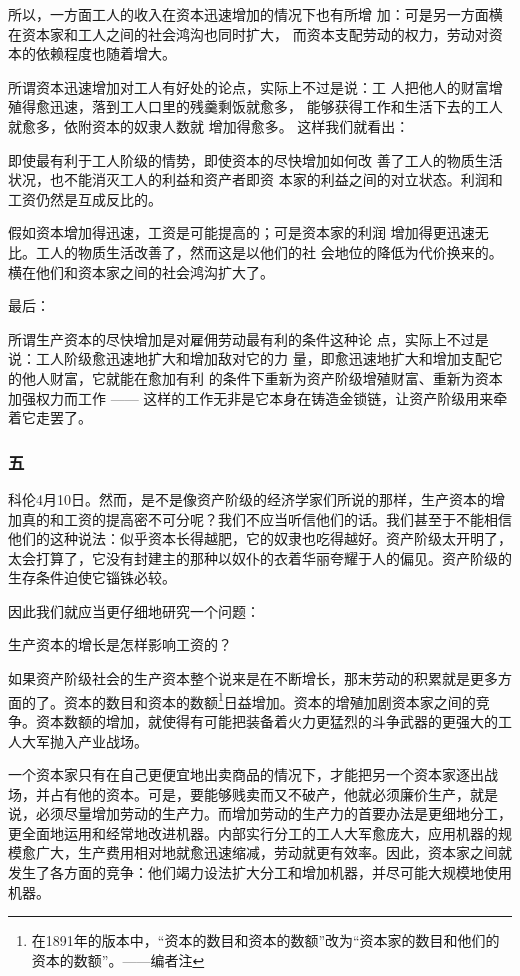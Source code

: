 \documentclass[a4paper,twoside,12pt,AutoFakeBold]{ctexart}
\begin{document}
所以，一方面工人的收入在资本迅速增加的情况下也有所增
加：可是另一方面横在资本家和工人之间的社会鸿沟也同时扩大，
而资本支配劳动的权力，劳动对资本的依赖程度也随着增大。

所谓资本迅速增加对工人有好处的论点，实际上不过是说：工
人把他人的财富增殖得愈迅速，落到工人口里的残羹剩饭就愈多，
能够获得工作和生活下去的工人就愈多，依附资本的奴隶人数就
增加得愈多。
这样我们就看出：

即使最有利于工人阶级的情势，即使资本的尽快增加如何改
善了工人的物质生活状况，也不能消灭工人的利益和资产者即资
本家的利益之间的对立状态。利润和工资仍然是互成反比的。

假如资本增加得迅速，工资是可能提高的；可是资本家的利润
增加得更迅速无比。工人的物质生活改善了，然而这是以他们的社
会地位的降低为代价换来的。横在他们和资本家之间的社会鸿沟扩大了。

最后：

所谓生产资本的尽快增加是对雇佣劳动最有利的条件这种论
点，实际上不过是说：工人阶级愈迅速地扩大和增加敌对它的力
量，即愈迅速地扩大和增加支配它的他人财富，它就能在愈加有利
的条件下重新为资产阶级增殖财富、重新为资本加强权力而工作
—— 这样的工作无非是它本身在铸造金锁链，让资产阶级用来牵
着它走罢了。

\subsubsection{五}

科伦4月10日。然而，是不是像资产阶级的经济学家们所说的那样，生产资本的增加真的和工资的提高密不可分呢？我们不应当听信他们的话。我们甚至于不能相信他们的这种说法：似乎资本长得越肥，它的奴隶也吃得越好。资产阶级太开明了，太会打算了，它没有封建主的那种以奴仆的衣着华丽夸耀于人的偏见。资产阶级的生存条件迫使它锱铢必较。

因此我们就应当更仔细地研究一个问题：

生产资本的增长是怎样影响工资的？

如果资产阶级社会的生产资本整个说来是在不断增长，那末劳动的积累就是更多方面的了。资本的数目和资本的数额\footnote{在1891年的版本中，“资本的数目和资本的数额”改为“资本家的数目和他们的资本的数额”。——编者注}日益增加。资本的增殖加剧资本家之间的竞争。资本数额的增加，就使得有可能把装备着火力更猛烈的斗争武器的更强大的工人大军抛入产业战场。

一个资本家只有在自己更便宜地出卖商品的情况下，才能把另一个资本家逐出战场，并占有他的资本。可是，要能够贱卖而又不破产，他就必须廉价生产，就是说，必须尽量增加劳动的生产力。而增加劳动的生产力的首要办法是更细地分工，更全面地运用和经常地改进机器。内部实行分工的工人大军愈庞大，应用机器的规模愈广大，生产费用相对地就愈迅速缩减，劳动就更有效率。因此，资本家之间就发生了各方面的竞争：他们竭力设法扩大分工和增加机器，并尽可能大规模地使用机器。
\end{document}
